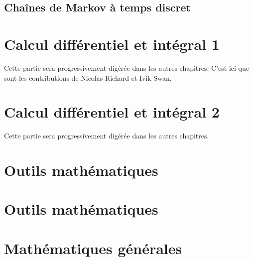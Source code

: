\chapter{Chaînes de Markov à temps discret}


\part{Calcul différentiel et intégral 1}
Cette partie sera progressivement digérée dans les autres chapitres. C'est ici que sont les contributions de Nicolas Richard et Ivik Swan.


\part{Calcul différentiel et intégral 2}
Cette partie sera progressivement digérée dans les autres chapitres. 


\part{Outils mathématiques}


\part{Outils mathématiques}


\part{Mathématiques générales}







    \printnomenclature
    \printindex







